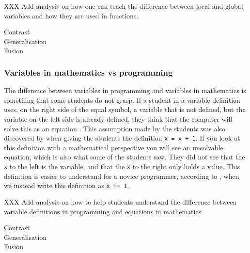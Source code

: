 XXX Add analysis on how one can teach the difference between local and 
global variables and how they are used in functions. 

\begin{description}
    \item[Contrast]
    \item[Generalisation]
    \item[Fusion]
\end{description}

\subsubsection{Variables in mathematics vs programming}

The difference between variables in programming and variables in 
mathematics is something that some students do not grasp. If a student in a 
variable 
definition uses, on the right side of the equal symbol, a variable that is 
not 
defined, but the variable on the left side is already defined, they think 
that 
the computer will solve this as an equation \parencite{Plass2015Variables}. 
This assumption made by the students was also discovered by 
\textcite{Kohn2017VariableEvaluation} when giving the students the 
definition 
\texttt{x = x + 1}. If you look at this definition with a 
mathematical 
perspective you will see an unsolvable equation, which is also what some of 
the 
students saw. They did not see that the \texttt{x} to the left 
is the 
variable, 
and that the \texttt{x} to the right only holds a value. This 
definition is  
easier to understand for a novice programmer, according to 
\textcite{Kohn2017VariableEvaluation}, when we instead write this 
definition as 
\texttt{x += 1}. 

XXX Add analysis on how to help students understand the difference between 
variable definitions in programming and equations in mathematics

\begin{description}
    \item[Contrast]
    \item[Generalisation]
    \item[Fusion]
\end{description}


